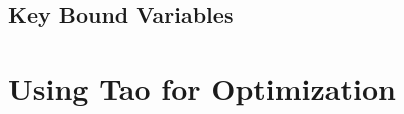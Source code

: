 \documentclass{hitec}
\newcommand{\Section}[1]{\section{#1}\vspace*{-1ex}}
\begin{document}
\subsection{Key Bound Variables}



\Section{Using Tao for Optimization}

\subsection{}


\subsection{}
\end{document}
